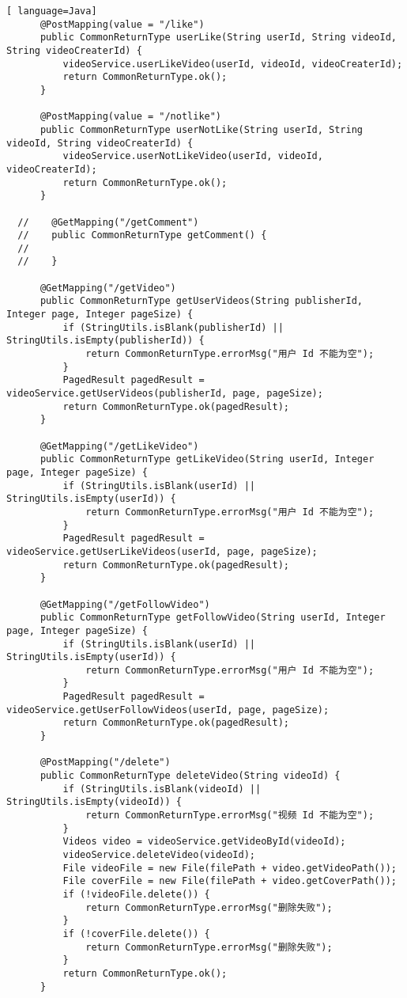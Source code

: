 \begin{lstlisting}[ language=Java]
      @PostMapping(value = "/like")
      public CommonReturnType userLike(String userId, String videoId, String videoCreaterId) {
          videoService.userLikeVideo(userId, videoId, videoCreaterId);
          return CommonReturnType.ok();
      }
  
      @PostMapping(value = "/notlike")
      public CommonReturnType userNotLike(String userId, String videoId, String videoCreaterId) {
          videoService.userNotLikeVideo(userId, videoId, videoCreaterId);
          return CommonReturnType.ok();
      }
  
  //    @GetMapping("/getComment")
  //    public CommonReturnType getComment() {
  //
  //    }
  
      @GetMapping("/getVideo")
      public CommonReturnType getUserVideos(String publisherId, Integer page, Integer pageSize) {
          if (StringUtils.isBlank(publisherId) || StringUtils.isEmpty(publisherId)) {
              return CommonReturnType.errorMsg("用户 Id 不能为空");
          }
          PagedResult pagedResult = videoService.getUserVideos(publisherId, page, pageSize);
          return CommonReturnType.ok(pagedResult);
      }
  
      @GetMapping("/getLikeVideo")
      public CommonReturnType getLikeVideo(String userId, Integer page, Integer pageSize) {
          if (StringUtils.isBlank(userId) || StringUtils.isEmpty(userId)) {
              return CommonReturnType.errorMsg("用户 Id 不能为空");
          }
          PagedResult pagedResult = videoService.getUserLikeVideos(userId, page, pageSize);
          return CommonReturnType.ok(pagedResult);
      }
  
      @GetMapping("/getFollowVideo")
      public CommonReturnType getFollowVideo(String userId, Integer page, Integer pageSize) {
          if (StringUtils.isBlank(userId) || StringUtils.isEmpty(userId)) {
              return CommonReturnType.errorMsg("用户 Id 不能为空");
          }
          PagedResult pagedResult = videoService.getUserFollowVideos(userId, page, pageSize);
          return CommonReturnType.ok(pagedResult);
      }
  
      @PostMapping("/delete")
      public CommonReturnType deleteVideo(String videoId) {
          if (StringUtils.isBlank(videoId) || StringUtils.isEmpty(videoId)) {
              return CommonReturnType.errorMsg("视频 Id 不能为空");
          }
          Videos video = videoService.getVideoById(videoId);
          videoService.deleteVideo(videoId);
          File videoFile = new File(filePath + video.getVideoPath());
          File coverFile = new File(filePath + video.getCoverPath());
          if (!videoFile.delete()) {
              return CommonReturnType.errorMsg("删除失败");
          }
          if (!coverFile.delete()) {
              return CommonReturnType.errorMsg("删除失败");
          }
          return CommonReturnType.ok();
      }
  

\end{lstlisting}
